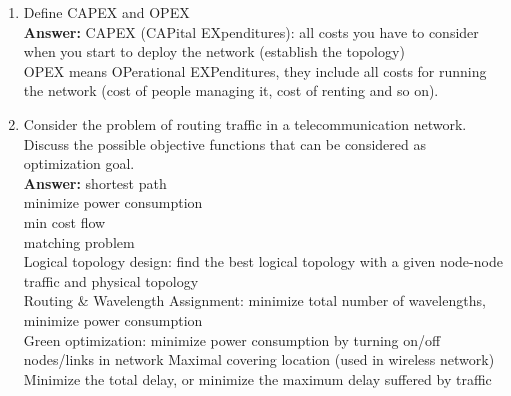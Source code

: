 \documentclass[a4paper]{article}
\begin{document}
\begin{enumerate}
\item Define CAPEX and OPEX \\
\textbf{Answer:} CAPEX (CAPital EXpenditures): all costs you have to consider when you start to deploy the network (establish the topology)\\
OPEX means OPerational EXPenditures, they include all costs for running the network (cost of people managing it, cost of renting and so on).

\item Consider the problem of routing traffic in  a  telecommunication network. Discuss  the  possible  objective  functions that  can  be  considered  as optimization goal.\\
\textbf{Answer:}
shortest path\\
minimize power consumption\\
min cost flow\\
matching problem\\
Logical topology design: find the best logical topology with a given node-node traffic and physical topology\\
Routing & Wavelength Assignment: minimize total number of wavelengths, minimize power consumption\\
Green optimization: minimize power consumption by turning on/off nodes/links in network
Maximal covering location (used in wireless network)\\
Minimize the total delay, or minimize the maximum delay suffered by traffic\\


\end{enumerate}
\end{document}
